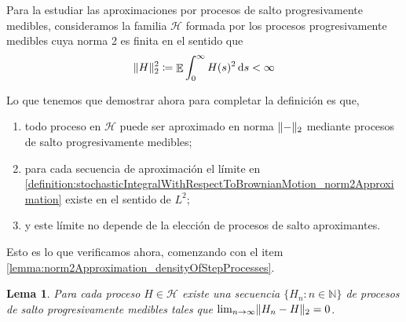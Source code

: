 \documentclass{report}
\newcommand{\placeholderParameter}{-}
\newcommand{\dd}{\mathop{}\!\mathrm{d}}
\newcommand{\naturalNumbers}{\mathbb{N}}
\DeclareMathOperator{\Expectation}{\mathbb{E}}
\DeclarePairedDelimiter{\norm}{\|}{\|}
\theoremstyle{plain}
\newtheorem{lemma}{Lema}
\theoremstyle{remark}
\theoremstyle{definition}
\begin{document}
Para la estudiar las aproximaciones por procesos de salto progresivamente medibles, consideramos la familia \(\mathcal{H}\) formada por los procesos progresivamente medibles cuya norma 2 es finita en el sentido que
\begin{align}
  \norm{H}_2^2
  \coloneqq
  \Expectation \int_0^{\infty} H(s)^2 \dd s
  <
  \infty
\end{align}

Lo que tenemos que demostrar ahora para completar la definición es que,
\begin{enumerate}
  \item
  \label{lemma:norm2Approximation_densityOfStepProcesses}
  todo proceso en \(\mathcal{H}\) puede ser aproximado en norma 
  \(\norm{\placeholderParameter}_2\) 
  mediante procesos de salto progresivamente medibles;
  \item
  \label{lemma:norm2Approximation_sequenceConvergence}
  para cada secuencia de aproximación el límite en \eqref{definition:stochasticIntegralWithRespectToBrownianMotion_norm2Approximation} existe en el sentido de \(L^2\);
  \item
  \label{lemma:norm2Approximation_limitUniqueness}
  y este límite no depende de la elección de procesos de salto aproximantes.
\end{enumerate} 
Esto es lo que verificamos ahora, comenzando con el item \ref{lemma:norm2Approximation_densityOfStepProcesses}.
\begin{lemma}
  Para cada proceso \(H \in \mathcal{H}\) existe una secuencia \(\{H_n : n \in \naturalNumbers\}\) de procesos de salto progresivamente medibles tales que \(\lim_{n \rightarrow \infty} \norm{H_n - H}_2 = 0\).
\end{lemma}
\end{document}
